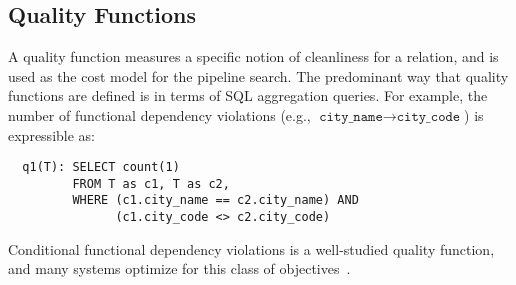 


\subsection{Quality Functions}

A quality function measures a specific notion of cleanliness for a relation, and is used as the cost model for the pipeline search.  The predominant way that quality functions are defined is in terms of SQL aggregation queries. For example, the number of functional dependency violations (e.g., $\texttt{city\_name} \rightarrow \texttt{city\_code}$) is expressible as:
{\small\begin{lstlisting}
  q1(T): SELECT count(1)
         FROM T as c1, T as c2,
         WHERE (c1.city_name == c2.city_name) AND
               (c1.city_code <> c2.city_code)
\end{lstlisting}}
\noindent Conditional functional dependency violations is a well-studied quality function, and many systems optimize for this class of objectives~\cite{rekatsinas2017holoclean,DBLP:conf/sigmod/ChuIKW16}.   

